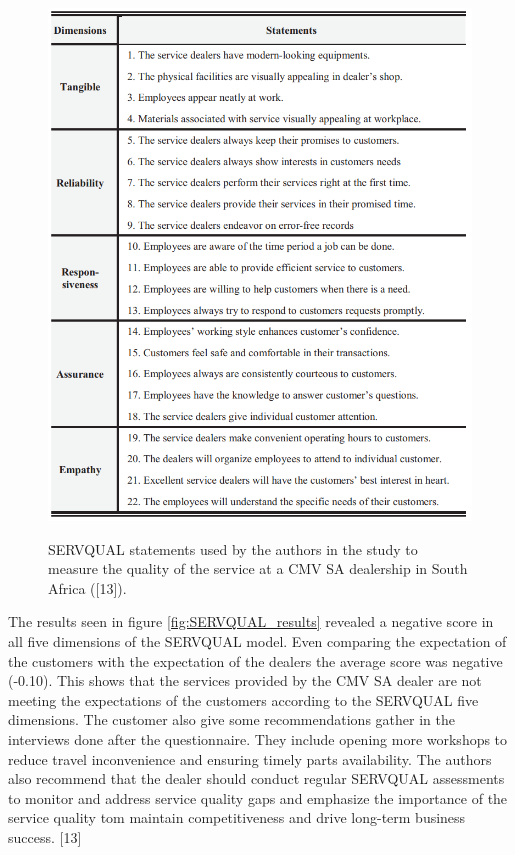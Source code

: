 \begin{figure}[h]
  \caption{SERVQUAL statements used by the authors in the study to measure the quality of the service at a CMV SA dealership in South Africa ([13]).}
  \centering
  \includegraphics[width=\textwidth]{figs/SERVQUAL_statements}
  \label{fig:SERVQUAL_statements}
\end{figure}


The results seen in figure \ref{fig:SERVQUAL_results} revealed a negative score in all five dimensions of the SERVQUAL model. 
Even comparing the expectation of the customers with the expectation of the dealers the average score was negative (-0.10).
This shows that the services provided by the CMV SA dealer are not meeting the expectations of the customers according to the SERVQUAL five dimensions.
The customer also give some recommendations gather in the interviews done after the questionnaire. 
They include opening more workshops to reduce travel inconvenience and ensuring timely parts availability.
The authors also recommend that the dealer should conduct regular SERVQUAL assessments to monitor and address service quality gaps and emphasize the importance of the service quality tom maintain competitiveness and drive long-term business success. [13]


